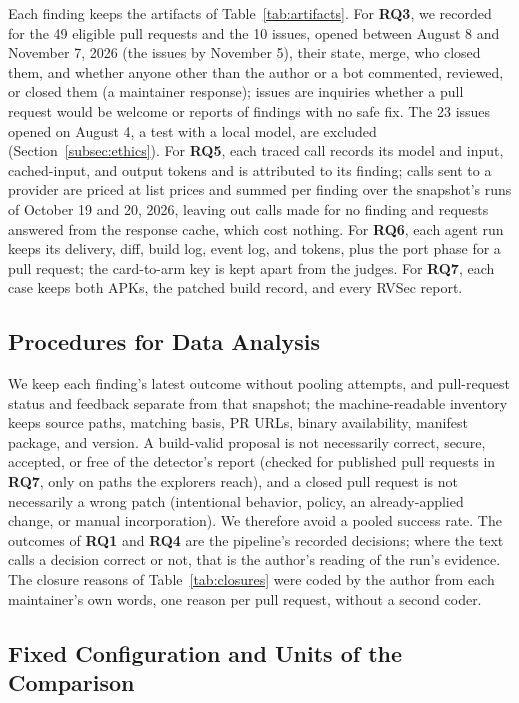 \documentclass[conference]{IEEEtran}
\newcommand{\researchq}[1]{\textbf{RQ#1}}
\begin{document}
Each finding keeps the artifacts of Table~\ref{tab:artifacts}. For
\researchq{3}, we recorded for the 49 eligible pull requests and the 10 issues,
opened between August 8 and November 7, 2026 (the issues by November 5), their
state, merge, who closed them,
and whether anyone other than the author or a bot commented, reviewed, or
closed them (a maintainer response); issues are inquiries whether a pull
request would be welcome or reports of findings with no safe fix. The 23
issues opened on August 4, a test with a local model, are excluded
(Section~\ref{subsec:ethics}). For
\researchq{5}, each traced call records its model and input, cached-input, and
output tokens and is attributed to its finding; calls sent to a provider are
priced at list prices and summed per finding over the snapshot's runs of
October 19 and 20, 2026, leaving out calls
made for no finding and requests answered from the response cache, which cost
nothing. For \researchq{6}, each agent run keeps its delivery, diff, build
log, event log, and tokens, plus the port phase for a pull request; the
card-to-arm key is kept apart from the judges. For \researchq{7}, each case
keeps both APKs, the patched build record, and every RVSec report.

\subsection{Procedures for Data Analysis}
\label{subsec:analysis}

We keep each finding's latest outcome without pooling attempts, and pull-request status
and feedback separate from that snapshot; the machine-readable inventory keeps
source paths, matching basis, PR URLs, binary availability, manifest package,
and version. A build-valid proposal is not necessarily correct, secure,
accepted, or free of the detector's report (checked for published pull
requests in \researchq{7}, only on paths the explorers reach), and a closed
pull request is not necessarily a wrong patch (intentional behavior, policy, an
already-applied change, or manual incorporation). We therefore avoid a pooled
success rate. The outcomes of \researchq{1} and \researchq{4} are the
pipeline's recorded decisions; where the text calls a decision correct or not,
that is the author's reading of the run's evidence. The closure reasons of
Table~\ref{tab:closures} were coded by the author from each maintainer's own
words, one reason per pull request, without a second coder.

\subsection{Fixed Configuration and Units of the Comparison}
\label{subsec:frozen}
\end{document}
